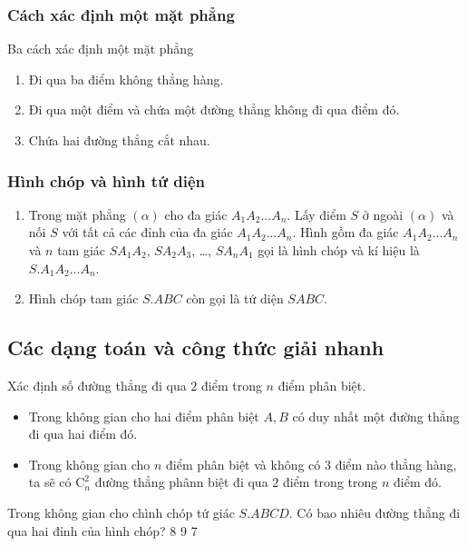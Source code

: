 \subsubsection{Cách xác định một mặt phẳng}
Ba cách xác định một mặt phẳng
\begin{enumerate}
	\item Đi qua ba điểm không thẳng hàng.
	\item Đi qua một điểm và chứa một đường thẳng không đi qua điểm đó.
	\item Chứa hai đường thẳng cắt nhau.
\end{enumerate}

\subsubsection{Hình chóp và hình tứ diện}
\begin{enumerate}
	\item Trong mặt phẳng $(\alpha)$ cho đa giác $A_1A_2...A_n$. Lấy điểm $S$ ở ngoài $(\alpha)$ và nối $S$ với tất cả các đỉnh của đa giác $A_1A_2...A_n$. Hình gồm đa giác $A_1A_2...A_n$ và $n$ tam giác $SA_1A_2$, $SA_2A_3$, \ldots, $SA_nA_1$ gọi là hình chóp và kí hiệu là $S.A_1A_2...A_n$.
	\item Hình chóp tam giác $S.ABC$ còn gọi là tứ diện $SABC$.
\end{enumerate}

\subsection{Các dạng toán và công thức giải nhanh}

\begin{dang}{Xác định số đường thẳng đi qua $ 2 $ điểm trong $ n $ điểm phân biệt.}
	
	\begin{itemize}
		\item 	Trong không gian cho hai điểm phân biệt $A,B $ có duy nhất một đường thẳng đi qua hai điểm đó.
		\item	Trong không gian cho $ n $ điểm phân biệt và không có $ 3 $ điểm nào thẳng hàng, ta sẽ có $ \mathrm{C}^2_n $ đường thẳng phânn biệt đi qua $ 2 $ điểm trong trong $ n $ điểm đó.
	\end{itemize}
\end{dang}
\begin{vd}%
	Trong không gian cho chình chóp tứ giác $ S.ABCD $. Có bao nhiêu đường thẳng đi qua hai đỉnh của hình chóp?
	\choice
	{8}
	{9}
	{}
	{7}
\end{vd}

